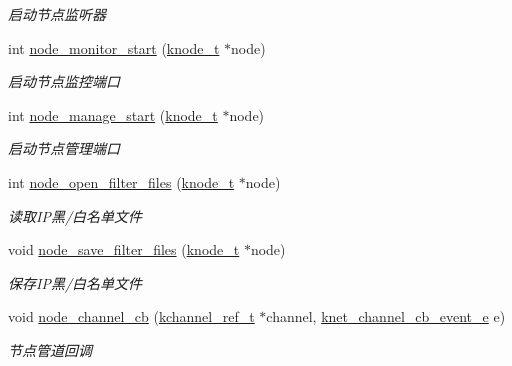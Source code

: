 \begin{DoxyCompactItemize}
\begin{DoxyCompactList}\small\item\em 启动节点监听器 \end{DoxyCompactList}\item 
int \hyperlink{a00102_a5e5fcccd2fb05ab7a07f8c005099f84d_a5e5fcccd2fb05ab7a07f8c005099f84d}{node\+\_\+monitor\+\_\+start} (\hyperlink{a00066_a5e720b27efbc9ad744240f5f4233763a_a5e720b27efbc9ad744240f5f4233763a}{knode\+\_\+t} $\ast$node)
\begin{DoxyCompactList}\small\item\em 启动节点监控端口 \end{DoxyCompactList}\item 
int \hyperlink{a00102_a2f0598c2b8f04a787f9016afb1247b63_a2f0598c2b8f04a787f9016afb1247b63}{node\+\_\+manage\+\_\+start} (\hyperlink{a00066_a5e720b27efbc9ad744240f5f4233763a_a5e720b27efbc9ad744240f5f4233763a}{knode\+\_\+t} $\ast$node)
\begin{DoxyCompactList}\small\item\em 启动节点管理端口 \end{DoxyCompactList}\item 
int \hyperlink{a00102_af21be279fb6545838987e35d2022d8de_af21be279fb6545838987e35d2022d8de}{node\+\_\+open\+\_\+filter\+\_\+files} (\hyperlink{a00066_a5e720b27efbc9ad744240f5f4233763a_a5e720b27efbc9ad744240f5f4233763a}{knode\+\_\+t} $\ast$node)
\begin{DoxyCompactList}\small\item\em 读取\+I\+P黑/白名单文件 \end{DoxyCompactList}\item 
void \hyperlink{a00102_a54139242ade232ae556dc2781bf36c76_a54139242ade232ae556dc2781bf36c76}{node\+\_\+save\+\_\+filter\+\_\+files} (\hyperlink{a00066_a5e720b27efbc9ad744240f5f4233763a_a5e720b27efbc9ad744240f5f4233763a}{knode\+\_\+t} $\ast$node)
\begin{DoxyCompactList}\small\item\em 保存\+I\+P黑/白名单文件 \end{DoxyCompactList}\item 
void \hyperlink{a00102_a01e50baec5274bf618ded8d00678e131_a01e50baec5274bf618ded8d00678e131}{node\+\_\+channel\+\_\+cb} (\hyperlink{a00066_a3b7e82599367eade261456f60ebe2cd9_a3b7e82599367eade261456f60ebe2cd9}{kchannel\+\_\+ref\+\_\+t} $\ast$channel, \hyperlink{a00066_a2fd2faf971268f5b682ab375c455f7c9_a2fd2faf971268f5b682ab375c455f7c9}{knet\+\_\+channel\+\_\+cb\+\_\+event\+\_\+e} e)
\begin{DoxyCompactList}\small\item\em 节点管道回调 \end{DoxyCompactList}\item 

\end{DoxyCompactItemize}
